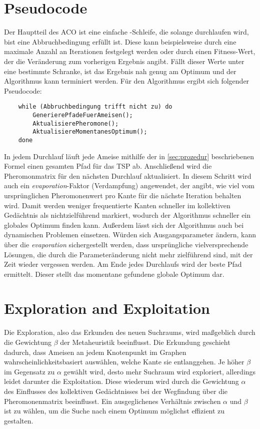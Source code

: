 \section{Pseudocode}

Der Hauptteil des ACO ist eine einfache -Schleife, die solange
durchlaufen wird, bist eine Abbruchbedingung erfüllt ist. Diese kann
beispielsweise durch eine maximale Anzahl an Iterationen festgelegt werden
oder durch einen Fitness-Wert, der die Veränderung zum vorherigen Ergebnis
angibt. Fällt dieser Werte unter eine bestimmte Schranke, ist das Ergebnis
nah genug am Optimum und der Algorithmus kann terminiert werden.
Für den Algorithmus ergibt sich folgender Pseudocode:

\begin{lstlisting}
    while (Abbruchbedingung trifft nicht zu) do
        GenerierePfadeFuerAmeisen();
        AktualisierePheromone();
        AktualisiereMomentanesOptimum();
    done
\end{lstlisting}

In jedem Durchlauf läuft jede Ameise mithilfe der in \ref{sec:prozedur}
beschriebenen Formel einen gesamten Pfad für das TSP ab. Anschließend
wird die Pheromonmatrix für den nächsten Durchlauf aktualisiert.
In diesem Schritt wird auch ein \emph{evaporation}-Faktor (Verdampfung)
angewendet, der angibt, wie viel vom ursprünglichen Pheromonenwert pro
Kante für die nächste Iteration behalten wird. Damit werden weniger
frequentierte Kanten schneller im kollektiven Gedächtnis als
nichtzielführend markiert, wodurch der Algorithmus schneller ein globales
Optimum finden kann.
Außerdem lässt sich der Algorithmus auch bei dynamischen Problemen einsetzen.
Würden sich Ausgangsparameter ändern, kann über die \emph{evaporation}
sichergestellt werden, dass ursprüngliche vielversprechende Lösungen, die
durch die Parameteränderung nicht mehr zielführend sind, mit der Zeit wieder
vergessen werden.
Am Ende jedes Durchlaufs wird der beste Pfad ermittelt. Dieser stellt das
momentane gefundene globale Optimum dar.

\section{Exploration and Exploitation}

Die Exploration, also das Erkunden des neuen Suchraums, wird maßgeblich durch
die Gewichtung $\beta$ der Metaheuristik beeinflusst. Die Erkundung geschieht
dadurch, dass Ameisen an jedem Knotenpunkt im Graphen wahrscheinlichkeitsbasiert
auswählen, welche Kante sie entlanggehen. Je höher $\beta$ im Gegensatz zu
$\alpha$ gewählt wird, desto mehr Suchraum wird exploriert, allerdings leidet
darunter die Exploitation.
Diese wiederum wird durch die Gewichtung $\alpha$ des Einflusses des
kollektiven Gedächtnisses bei der Wegfindung über die Pheromonenmatrix
beeinflusst.
Ein ausgeglichenes Verhältnis zwischen $\alpha$ und $\beta$ ist zu wählen, um
die Suche nach einem Optimum möglichst effizient zu gestalten.


